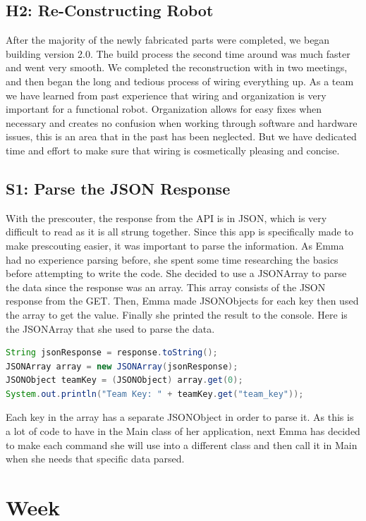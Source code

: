 \documentclass{article}
\begin{document}
\subsection{H2: Re-Constructing Robot}

After the majority of the newly fabricated parts were completed, we began building version 2.0. The build process the second time around was much faster and went very smooth. We completed the reconstruction with in two meetings, and then began the long and tedious process of wiring everything up. As a team we have learned from past experience that wiring and organization is very important for a functional robot. Organization allows for easy fixes when necessary and creates no confusion when working through software and hardware issues, this is an area that in the past has been neglected. But we have dedicated time and effort to make sure that wiring is cosmetically pleasing and concise. \subsection{S1: Parse the JSON Response}

With the prescouter, the response from the API is in JSON, which is very difficult to read as it is all strung together. Since this app is specifically made to make prescouting easier, it was important to parse the information. As Emma had no experience parsing before, she spent some time researching the basics before attempting to write the code. She decided to use a JSONArray to parse the data since the response was an array. This array consists of the JSON response from the GET. Then, Emma made JSONObjects for each key then used the array to get the value. Finally she printed the result to the console. Here is the JSONArray that she used to parse the data. 

\begin{lstlisting}[language=Java]
String jsonResponse = response.toString();
JSONArray array = new JSONArray(jsonResponse);
JSONObject teamKey = (JSONObject) array.get(0);
System.out.println("Team Key: " + teamKey.get("team_key"));

\end{lstlisting}

Each key in the array has a separate JSONObject in order to parse it. As this is a lot of code to have in the Main class of her application, next Emma has decided to make each command she will use into a different class and then call it in Main when she needs that specific data parsed. 
\clearpage \newpage \section{Week \thesection} 
\end{document}
